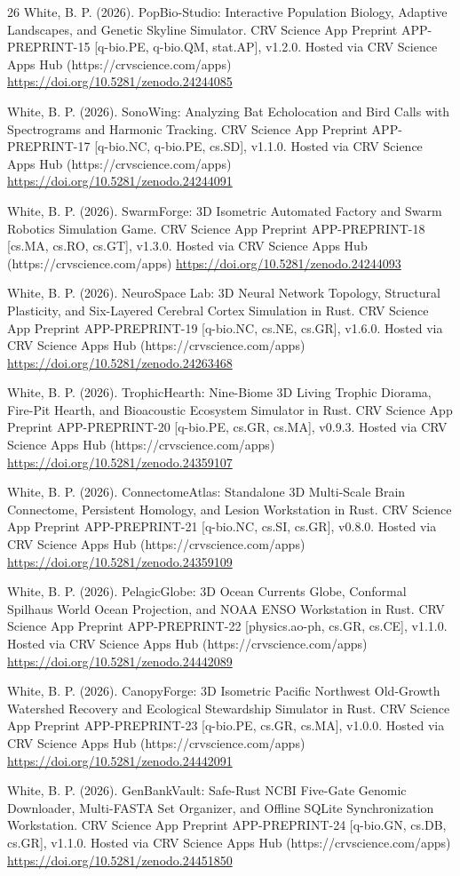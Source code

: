 \documentclass[10pt,letterpaper]{article}
\begin{document}
\begin{thebibliography}{26}
 White, B. P. (2026). PopBio-Studio: Interactive Population Biology, Adaptive Landscapes, and Genetic Skyline Simulator. CRV Science App Preprint APP-PREPRINT-15 [q-bio.PE, q-bio.QM, stat.AP], v1.2.0. Hosted via CRV Science Apps Hub (https://crvscience.com/apps) \url{https://doi.org/10.5281/zenodo.24244085}

 White, B. P. (2026). SonoWing: Analyzing Bat Echolocation and Bird Calls with Spectrograms and Harmonic Tracking. CRV Science App Preprint APP-PREPRINT-17 [q-bio.NC, q-bio.PE, cs.SD], v1.1.0. Hosted via CRV Science Apps Hub (https://crvscience.com/apps) \url{https://doi.org/10.5281/zenodo.24244091}

 White, B. P. (2026). SwarmForge: 3D Isometric Automated Factory and Swarm Robotics Simulation Game. CRV Science App Preprint APP-PREPRINT-18 [cs.MA, cs.RO, cs.GT], v1.3.0. Hosted via CRV Science Apps Hub (https://crvscience.com/apps) \url{https://doi.org/10.5281/zenodo.24244093}

 White, B. P. (2026). NeuroSpace Lab: 3D Neural Network Topology, Structural Plasticity, and Six-Layered Cerebral Cortex Simulation in Rust. CRV Science App Preprint APP-PREPRINT-19 [q-bio.NC, cs.NE, cs.GR], v1.6.0. Hosted via CRV Science Apps Hub (https://crvscience.com/apps) \url{https://doi.org/10.5281/zenodo.24263468}

 White, B. P. (2026). TrophicHearth: Nine-Biome 3D Living Trophic Diorama, Fire-Pit Hearth, and Bioacoustic Ecosystem Simulator in Rust. CRV Science App Preprint APP-PREPRINT-20 [q-bio.PE, cs.GR, cs.MA], v0.9.3. Hosted via CRV Science Apps Hub (https://crvscience.com/apps) \url{https://doi.org/10.5281/zenodo.24359107}

 White, B. P. (2026). ConnectomeAtlas: Standalone 3D Multi-Scale Brain Connectome, Persistent Homology, and Lesion Workstation in Rust. CRV Science App Preprint APP-PREPRINT-21 [q-bio.NC, cs.SI, cs.GR], v0.8.0. Hosted via CRV Science Apps Hub (https://crvscience.com/apps) \url{https://doi.org/10.5281/zenodo.24359109}

 White, B. P. (2026). PelagicGlobe: 3D Ocean Currents Globe, Conformal Spilhaus World Ocean Projection, and NOAA ENSO Workstation in Rust. CRV Science App Preprint APP-PREPRINT-22 [physics.ao-ph, cs.GR, cs.CE], v1.1.0. Hosted via CRV Science Apps Hub (https://crvscience.com/apps) \url{https://doi.org/10.5281/zenodo.24442089}

 White, B. P. (2026). CanopyForge: 3D Isometric Pacific Northwest Old-Growth Watershed Recovery and Ecological Stewardship Simulator in Rust. CRV Science App Preprint APP-PREPRINT-23 [q-bio.PE, cs.GR, cs.MA], v1.0.0. Hosted via CRV Science Apps Hub (https://crvscience.com/apps) \url{https://doi.org/10.5281/zenodo.24442091}

 White, B. P. (2026). GenBankVault: Safe-Rust NCBI Five-Gate Genomic Downloader, Multi-FASTA Set Organizer, and Offline SQLite Synchronization Workstation. CRV Science App Preprint APP-PREPRINT-24 [q-bio.GN, cs.DB, cs.GR], v1.1.0. Hosted via CRV Science Apps Hub (https://crvscience.com/apps) \url{https://doi.org/10.5281/zenodo.24451850}
\end{thebibliography}
\end{document}
